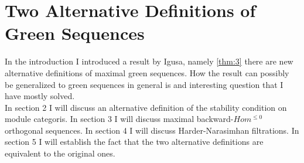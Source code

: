 \chapter{Two Alternative Definitions of Green Sequences}\label{C3}
\indent In the introduction I introduced a result by Igusa, namely \ref{thm:3} there are new alternative definitions of maximal green sequences. How the result can possibly be generalized to green sequences in general is and interesting question that I have mostly solved.\\
\indent In section 2 I will discuss an alternative definition of the stability condition on module categoris. In section 3 I will discuss maximal backward-$Hom^{\leq 0}$ orthogonal sequences. In section 4 I will discuss Harder-Narasimhan filtrations. In section 5 I will establish the fact that the two alternative definitions are equivalent to the original ones.\\
